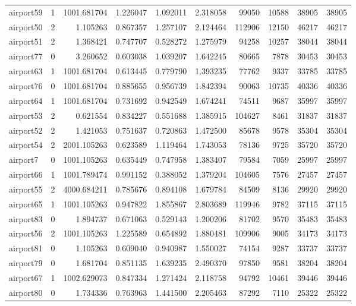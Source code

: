 \begin{longtable}{|l|r|r|r|r|r|r|r|r|r|}
airport59 & 1 & 1001.681704 & 1.226047 & 1.092011 & 2.318058 & 99050 & 10588 & 38905 & 38905 \\
airport50 & 2 & 1.105263 & 0.867357 & 1.257107 & 2.124464 & 112906 & 12150 & 46217 & 46217 \\
airport51 & 2 & 1.368421 & 0.747707 & 0.528272 & 1.275979 & 94258 & 10257 & 38044 & 38044 \\
airport77 & 0 & 3.260652 & 0.603038 & 1.039207 & 1.642245 & 80665 & 7878 & 30453 & 30453 \\
airport63 & 1 & 1001.681704 & 0.613445 & 0.779790 & 1.393235 & 77762 & 9337 & 33785 & 33785 \\
airport76 & 0 & 1001.681704 & 0.885655 & 0.956739 & 1.842394 & 90063 & 10735 & 40336 & 40336 \\
airport64 & 1 & 1001.681704 & 0.731692 & 0.942549 & 1.674241 & 74511 & 9687 & 35997 & 35997 \\
airport53 & 2 & 0.621554 & 0.834227 & 0.551688 & 1.385915 & 104627 & 8461 & 31837 & 31837 \\
airport52 & 2 & 1.421053 & 0.751637 & 0.720863 & 1.472500 & 85678 & 9578 & 35304 & 35304 \\
airport54 & 2 & 2001.105263 & 0.623589 & 1.119464 & 1.743053 & 78136 & 9725 & 35720 & 35720 \\
airport7 & 0 & 1001.105263 & 0.635449 & 0.747958 & 1.383407 & 79584 & 7059 & 25997 & 25997 \\
airport66 & 1 & 1001.789474 & 0.991152 & 0.388052 & 1.379204 & 104605 & 7576 & 27457 & 27457 \\
airport55 & 2 & 4000.684211 & 0.785676 & 0.894108 & 1.679784 & 84509 & 8136 & 29920 & 29920 \\
airport65 & 1 & 1001.105263 & 0.947822 & 1.855867 & 2.803689 & 119946 & 9782 & 37115 & 37115 \\
airport83 & 0 & 1.894737 & 0.671063 & 0.529143 & 1.200206 & 81702 & 9570 & 35483 & 35483 \\
airport56 & 2 & 1001.105263 & 1.225589 & 0.654892 & 1.880481 & 109906 & 9005 & 34173 & 34173 \\
airport81 & 0 & 1.105263 & 0.609040 & 0.940987 & 1.550027 & 74154 & 9287 & 33737 & 33737 \\
airport79 & 0 & 1.681704 & 0.851135 & 1.639235 & 2.490370 & 97850 & 9581 & 38204 & 38204 \\
airport67 & 1 & 1002.629073 & 0.847334 & 1.271424 & 2.118758 & 94792 & 10461 & 39446 & 39446 \\
airport80 & 0 & 1.734336 & 0.763963 & 1.441500 & 2.205463 & 87292 & 7110 & 25322 & 25322 \\

\end{longtable}
